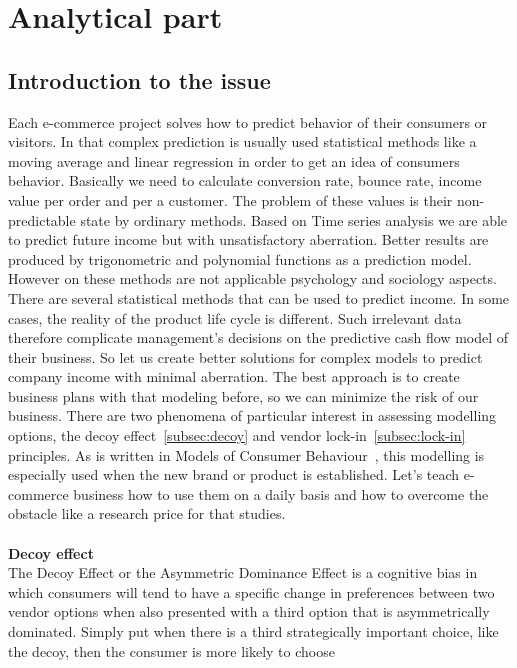 
\chapter{Analytical part} \label{sec:analytical}

\section{Introduction to the issue} \label{sec:description}
Each e-commerce project solves how to predict behavior of their consumers or visitors.
In that complex prediction is usually used statistical methods like a moving average and linear regression in order to
get an idea of consumers behavior.
Basically we need to calculate conversion rate, bounce rate, income value per order and per a customer.
The problem of these values is their non-predictable state by ordinary methods.
Based on Time series analysis we are able to predict
future income but with unsatisfactory aberration.
Better results are produced by trigonometric and polynomial functions as a prediction model.
However on these methods are not applicable psychology and sociology aspects.
There are several statistical methods that can be used to predict income.
In some cases, the reality of the product life cycle is different.
Such irrelevant data therefore complicate management's decisions on the predictive cash flow model of their business.
So let us create better solutions for complex models to predict company income with minimal aberration.
The best approach is to create business plans with that modeling before, so we can minimize the risk of our business.
There are  two phenomena of particular interest in assessing modelling options,  the decoy effect~\ref{subsec:decoy} and vendor lock-in~\ref{subsec:lock-in} principles.
As is written in Models of Consumer Behaviour~\cite{patel}, this modelling is especially used when the new brand or product is established.
Let's teach e-commerce business how to use them on a daily basis and how to overcome the obstacle like a research price for that studies.\\
\\
\textbf{Decoy effect} \label{subsec:decoy}\\
The Decoy Effect or the Asymmetric Dominance Effect is a cognitive bias in which consumers will tend to have a specific
change in preferences between two vendor options when also presented with a third option that is asymmetrically dominated.
Simply put when there is a third strategically important choice, like the decoy, then the consumer is more likely to choose
